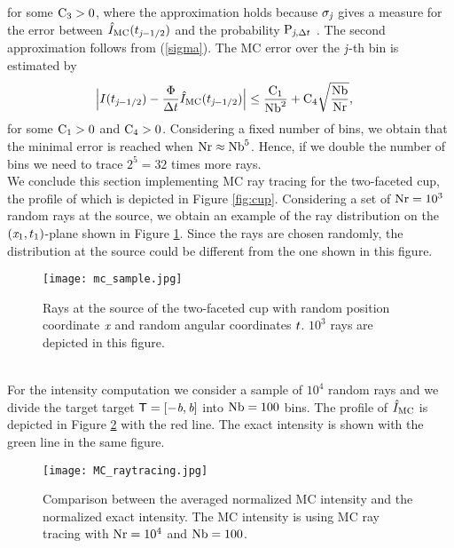 for some $\textrm{C}_3>0$, where the approximation holds because $\sigma_{\textit{j}}$ gives a measure for the error between
$\hat{I}_{\textrm{MC}}(t_{\textit{j}-1/2})$ and the probability $\textrm{P}_{\textit{j}, \Delta t}$ \cite{diez2012openintro}. The second approximation follows from (\ref{sigma}). The MC error over the $\textit{j}$-th bin is estimated by
\begin{equation} \begin{aligned}
\Big|I(t_{\textit{j}-1/2})&-\frac{\Phi}
{\Delta t}\hat{I}_{\textrm{MC}}(t_{\textit{j}-1/2})\Big| \leq
\frac{\textrm{C}_1}{\textrm{Nb}^2} + \textrm{C}_4\sqrt{\frac{\textrm{Nb}}{\textrm{Nr}}},
\end{aligned}
\end{equation}
for some $\textrm{C}_1>0$ and $\textrm{C}_4>0$.
Considering a fixed number of bins, we obtain that the minimal error is reached when $\textrm{Nr}\approx \textrm{Nb}^5$.
Hence, if we double the number of bins we need to trace $2^5 = 32$ times more rays.\\ \indent
We conclude this section implementing MC ray tracing for the two-faceted cup, the profile of which is depicted in Figure \ref{fig:cup}. 
Considering a set of $\textrm{Nr} = 10^3$ random rays 
at the source, we obtain an example of the ray distribution on the $(\textit{x}_1, t_1)$-plane shown in Figure \ref{fig:mc_sample1}. 
Since the rays are chosen randomly, the distribution at the source could be different from the one shown in this figure.
\begin{figure}[h]
\begin{center}
    \texttt{[image: mc\_sample.jpg]}
    \caption{Rays at the source of the two-faceted cup with random position coordinate $\textit{x}$ and random angular coordinates $t$. $10^3$ rays are depicted in this figure.}
    \label{fig:mc_sample1}
\end{center}
  \end{figure}
\\ \indent For the intensity computation we consider a sample of $10^4$ random rays and we divide the target target $\textsf{T} = [-\textit{b}, \textit{b}]$ into $\textrm{Nb}= 100$ bins.
The profile of $\hat{I}_{\textrm{MC}}$ is depicted in Figure \ref{fig:mc_intensity} with the red line. The exact intensity is shown with the green line in the same figure.
\begin{figure}[t]
\begin{center}
    \texttt{[image: MC\_raytracing.jpg]}
    \caption{Comparison between the averaged normalized MC intensity and the normalized exact intensity. The MC intensity is using MC ray tracing with $\textrm{Nr} = 10^4$ and $\textrm{Nb} = 100$.}
   \label{fig:mc_intensity}
\end{center}
\end{figure}
